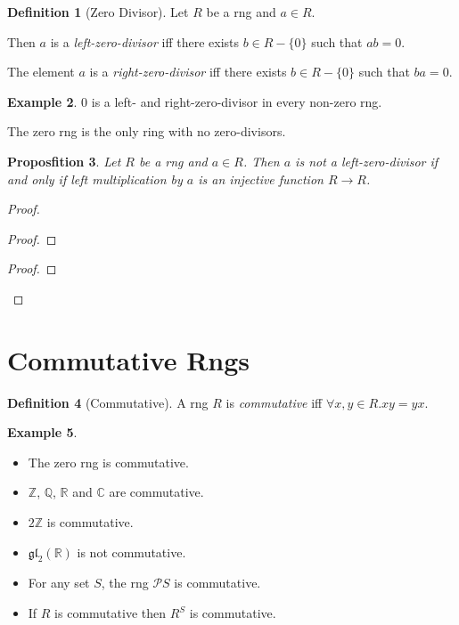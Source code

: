 \documentclass{book}
\let\qed\relax
\newtheorem{prop}{Proposfition}[chapter]
\theoremstyle{definition}
\newtheorem{df}[prop]{Definition}
\newtheorem{ex}[prop]{Example}
\newcommand{\gl}[2]{\ensuremath{\mathfrak{gl}_{#1} \left( {#2} \right)}}
\begin{document}
\begin{df}[Zero Divisor]
Let $R$ be a rng and $a \in R$.

Then $a$ is a \emph{left-zero-divisor} iff there exists $b \in R - \{0\}$ such that $ab = 0$.

The element $a$ is a \emph{right-zero-divisor} iff there exists $b \in R - \{0\}$ such that $ba = 0$.
\end{df}

\begin{ex}
0 is a left- and right-zero-divisor in every non-zero rng.

The zero rng is the only ring with no zero-divisors.
\end{ex}

\begin{prop}
Let $R$ be a rng and $a \in R$. Then $a$ is not a left-zero-divisor if and only if left multiplication by $a$ is an injective function $R \rightarrow R$.
\end{prop}

\begin{proof}
\pf
{}
\begin{proof}
\end{proof}
\begin{proof}
\end{proof}
\qed
\end{proof}

\section{Commutative Rngs}

\begin{df}[Commutative]
A rng $R$ is \emph{commutative} iff $\forall x,y \in R. xy = yx$.
\end{df}

\begin{ex}
\begin{itemize}
\item The zero rng is commutative.
\item $\mathbb{Z}$, $\mathbb{Q}$, $\mathbb{R}$ and $\mathbb{C}$ are commutative.
\item
$2 \mathbb{Z}$ is commutative.
\item $\gl{2}{\mathbb{R}}$ is not commutative.
\item For any set $S$, the rng $\mathcal{P} S$ is commutative.
\item If $R$ is commutative then $R^S$ is commutative.
\end{itemize}
\end{ex}
\end{document}
